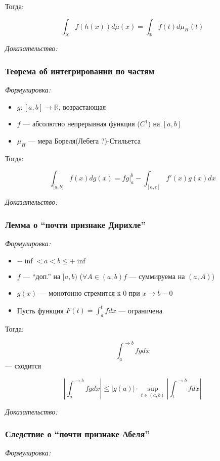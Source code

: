 \documentclass{article}
\begin{document}
Тогда:

\[\int_{X} f\left(h(x)\right)d\mu(x) = \int_{\mathbb{R}} f(t)d\mu_{H}(t)\]

\textit{Доказательство:}

\subsubsection{Теорема об интегрировании по частям}

\textit{Формулировка: }

\begin{itemize}
    \item $g: [a, b] \rightarrow \mathbb{R}$, возрастающая
    \item $f$ --- абсолютно непрерывная функция ($C^{1}$) на $[a, b]$
    \item $\mu_{H}$ --- мера Бореля(Лебега ?)-Стильетса
\end{itemize}

Тогда:

\[\int_{[a, b)} f(x) dg(x) = fg|_{a}^{b} - \int_{[a, c]} f'(x)g(x)dx\]

\textit{Доказательство:}
\newpage


\subsubsection{Лемма о  ``почти признаке Дирихле''}
\textit{Формулировка:}

\begin{itemize}
    \item $-\inf < a < b \le +\inf$
    \item $f$ --- ``доп.'' на $[a, b)$ ($\forall A \in (a, b) f$ --- суммируема на $(a, A)$)
    \item $g(x)$ --- монотонно стремится к 0 при $x \rightarrow b - 0$
    \item Пусть функция $F(t) = \int_{a}^{t} fdx$ --- ограничена
\end{itemize}

Тогда:

\[\int_{a}^{\rightarrow b} fg dx\] --- сходится

\[\left|\int_{a}^{\rightarrow b} fg dx\right| \le |g(a)| \cdot \sup_{t \in (a, b)} \left|\int_{t}^{\rightarrow b} f dx\right|\]

\textit{Доказательство:}


\subsubsection{Следствие о ``почти признаке Абеля''}
\textit{Формулировка:}
\end{document}
